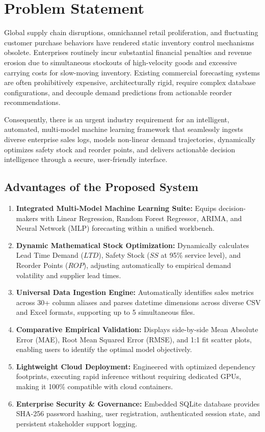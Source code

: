 \documentclass[12pt,a4paper]{report}
\begin{document}
\section{Problem Statement}
Global supply chain disruptions, omnichannel retail proliferation, and fluctuating customer purchase behaviors have rendered static inventory control mechanisms obsolete. Enterprises routinely incur substantial financial penalties and revenue erosion due to simultaneous stockouts of high-velocity goods and excessive carrying costs for slow-moving inventory. Existing commercial forecasting systems are often prohibitively expensive, architecturally rigid, require complex database configurations, and decouple demand predictions from actionable reorder recommendations.

Consequently, there is an urgent industry requirement for an intelligent, automated, multi-model machine learning framework that seamlessly ingests diverse enterprise sales logs, models non-linear demand trajectories, dynamically optimizes safety stock and reorder points, and delivers actionable decision intelligence through a secure, user-friendly interface.

\subsection*{Advantages of the Proposed System}
\begin{enumerate}
    \item \textbf{Integrated Multi-Model Machine Learning Suite:} Equips decision-makers with Linear Regression, Random Forest Regressor, ARIMA, and Neural Network (MLP) forecasting within a unified workbench.
    \item \textbf{Dynamic Mathematical Stock Optimization:} Dynamically calculates Lead Time Demand ($LTD$), Safety Stock ($SS$ at 95\% service level), and Reorder Points ($ROP$), adjusting automatically to empirical demand volatility and supplier lead times.
    \item \textbf{Universal Data Ingestion Engine:} Automatically identifies sales metrics across 30+ column aliases and parses datetime dimensions across diverse CSV and Excel formats, supporting up to 5 simultaneous files.
    \item \textbf{Comparative Empirical Validation:} Displays side-by-side Mean Absolute Error (MAE), Root Mean Squared Error (RMSE), and 1:1 fit scatter plots, enabling users to identify the optimal model objectively.
    \item \textbf{Lightweight Cloud Deployment:} Engineered with optimized dependency footprints, executing rapid inference without requiring dedicated GPUs, making it 100\% compatible with cloud containers.
    \item \textbf{Enterprise Security \& Governance:} Embedded SQLite database provides SHA-256 password hashing, user registration, authenticated session state, and persistent stakeholder support logging.
\end{enumerate}
\end{document}
